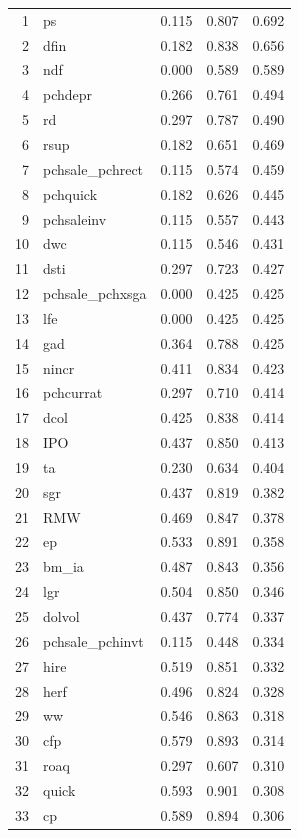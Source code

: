 \begin{footnotesize}
\begin{longtable}{rl|c|c|c}
		1 & ps & 0.115 & 0.807 & 0.692 \\ 
		2 & dfin & 0.182 & 0.838 & 0.656 \\ 
		3 & ndf & 0.000 & 0.589 & 0.589 \\ 
		4 & pchdepr & 0.266 & 0.761 & 0.494 \\ 
		5 & rd & 0.297 & 0.787 & 0.490 \\ 
		6 & rsup & 0.182 & 0.651 & 0.469 \\ 
		7 & pchsale\_pchrect & 0.115 & 0.574 & 0.459 \\ 
		8 & pchquick & 0.182 & 0.626 & 0.445 \\ 
		9 & pchsaleinv & 0.115 & 0.557 & 0.443 \\ 
		10 & dwc & 0.115 & 0.546 & 0.431 \\ 
		11 & dsti & 0.297 & 0.723 & 0.427 \\ 
		12 & pchsale\_pchxsga & 0.000 & 0.425 & 0.425 \\ 
		13 & lfe & 0.000 & 0.425 & 0.425 \\ 
		14 & gad & 0.364 & 0.788 & 0.425 \\ 
		15 & nincr & 0.411 & 0.834 & 0.423 \\ 
		16 & pchcurrat & 0.297 & 0.710 & 0.414 \\ 
		17 & dcol & 0.425 & 0.838 & 0.414 \\ 
		18 & IPO & 0.437 & 0.850 & 0.413 \\ 
		19 & ta & 0.230 & 0.634 & 0.404 \\ 
		20 & sgr & 0.437 & 0.819 & 0.382 \\ 
		21 & RMW & 0.469 & 0.847 & 0.378 \\ 
		22 & ep & 0.533 & 0.891 & 0.358 \\ 
		23 & bm\_ia & 0.487 & 0.843 & 0.356 \\ 
		24 & lgr & 0.504 & 0.850 & 0.346 \\ 
		25 & dolvol & 0.437 & 0.774 & 0.337 \\ 
		26 & pchsale\_pchinvt & 0.115 & 0.448 & 0.334 \\ 
		27 & hire & 0.519 & 0.851 & 0.332 \\ 
		28 & herf & 0.496 & 0.824 & 0.328 \\ 
		29 & ww & 0.546 & 0.863 & 0.318 \\ 
		30 & cfp & 0.579 & 0.893 & 0.314 \\ 
		31 & roaq & 0.297 & 0.607 & 0.310 \\ 
		32 & quick & 0.593 & 0.901 & 0.308 \\ 
		33 & cp & 0.589 & 0.894 & 0.306 \\ 

\end{longtable}
\end{footnotesize}
